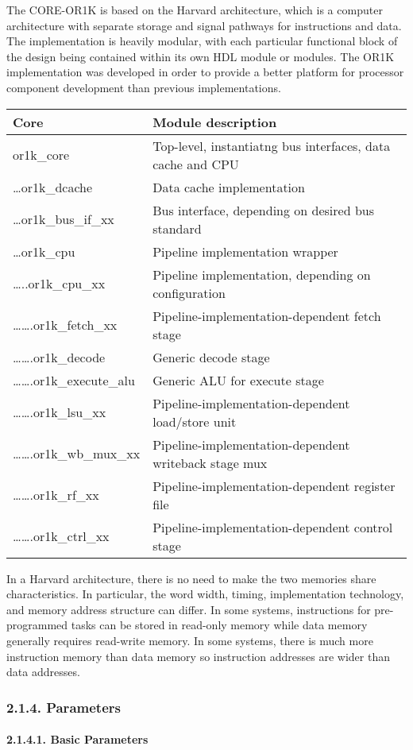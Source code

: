 \documentclass[]{article}
\let\oldparagraph\paragraph
\renewcommand{\paragraph}[1]{\oldparagraph{#1}\mbox{}}
\begin{document}
The CORE-OR1K is based on the Harvard architecture, which is a computer
architecture with separate storage and signal pathways for instructions
and data. The implementation is heavily modular, with each particular
functional block of the design being contained within its own HDL module
or modules. The OR1K implementation was developed in order to provide a
better platform for processor component development than previous
implementations.

\begin{longtable}[]{@{}ll@{}}
\toprule
Core & Module description\tabularnewline
\midrule
\endhead
or1k\_core & Top-level, instantiatng bus interfaces, data cache and
CPU\tabularnewline
\ldots{}or1k\_dcache & Data cache implementation\tabularnewline
\ldots{}or1k\_bus\_if\_xx & Bus interface, depending on desired bus
standard\tabularnewline
\ldots{}or1k\_cpu & Pipeline implementation wrapper\tabularnewline
\ldots{}..or1k\_cpu\_xx & Pipeline implementation, depending on
configuration\tabularnewline
\ldots{}\ldots{}.or1k\_fetch\_xx & Pipeline-implementation-dependent
fetch stage\tabularnewline
\ldots{}\ldots{}.or1k\_decode & Generic decode stage\tabularnewline
\ldots{}\ldots{}.or1k\_execute\_alu & Generic ALU for execute
stage\tabularnewline
\ldots{}\ldots{}.or1k\_lsu\_xx & Pipeline-implementation-dependent
load/store unit\tabularnewline
\ldots{}\ldots{}.or1k\_wb\_mux\_xx & Pipeline-implementation-dependent
writeback stage mux\tabularnewline
\ldots{}\ldots{}.or1k\_rf\_xx & Pipeline-implementation-dependent
register file\tabularnewline
\ldots{}\ldots{}.or1k\_ctrl\_xx & Pipeline-implementation-dependent
control stage\tabularnewline
\bottomrule
\end{longtable}

In a Harvard architecture, there is no need to make the two memories
share characteristics. In particular, the word width, timing,
implementation technology, and memory address structure can differ. In
some systems, instructions for pre-programmed tasks can be stored in
read-only memory while data memory generally requires read-write memory.
In some systems, there is much more instruction memory than data memory
so instruction addresses are wider than data addresses.

\subsubsection{2.1.4. Parameters}\label{parameters}

\paragraph{2.1.4.1. Basic Parameters}\label{basic-parameters}
\end{document}

